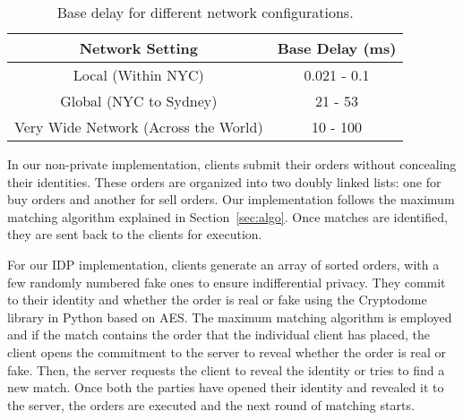 \begin{table}[h]
    \centering
    \begin{tabular}{|c|c|}
        \hline
        \textbf{Network Setting} & \textbf{Base Delay (ms)} \\
        \hline
        Local (Within NYC)              & 0.021 - 0.1                           \\
        Global (NYC to Sydney)   & 21 - 53    \\
        Very Wide Network (Across the World)        & 10 - 100                                \\
        \hline
    \end{tabular}
    \caption{Base delay for different network configurations.}
    \label{tab:network_delays}
\end{table}

In our non-private implementation, clients submit their orders without concealing their identities. These orders are organized into two doubly linked lists: one for buy orders and another for sell orders. Our implementation follows the maximum matching algorithm explained in Section~\ref{sec:algo}. Once matches are identified, they are sent back to the clients for execution.


For our IDP implementation, clients generate an array of sorted orders, with a few randomly numbered fake ones to ensure indifferential privacy.
They commit to their identity and whether the order is real or fake using the Cryptodome library in Python based on AES. The maximum matching algorithm is employed and if the match contains the order that the individual client has placed, the client opens the commitment to the server to reveal whether the order is real or fake. Then, the server requests the client to reveal the identity or tries to find a new match. Once both the parties have opened their identity and revealed it to the server, the orders are executed and the next round of matching starts. 


